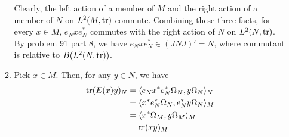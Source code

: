 \documentclass[a4paper,10pt]{report}
\newcommand{\ggen}[1]{\langle#1\rangle}
\begin{document}
\begin{enumerate}
\begin{enumerate}
				Clearly, the left action of a member of $M$ and the right action of a member of $N$ on $L^2(M,\operatorname{tr})$ commute. Combining these three facts, for every $x\in M$, $e_Nxe_N^*$ commutes with the right action of $N$ on $L^2(N,\operatorname{tr})$. By problem 91 part 8, we have $e_Nxe_N^*\in(JNJ)'=N$, where commutant is relative to $B(L^2(N,\operatorname{tr}))$. 
			\item Pick $x\in M$. 
				Then, for any $y\in N$, we have 
				\begin{align*}
					\tr(E(x)y)_N &= \ggen{e_Nx^*e_N^*\Omega_N,y\Omega_N}_N\\
					&= \ggen{x^*e_N^*\Omega_N,e_N^*y\Omega_N}_M\\
					&= \ggen{x^*\Omega_M,y\Omega_M}_M\\
					&= \tr(xy)_M
				\end{align*}
				

\end{enumerate}
\end{enumerate}
\end{document}
